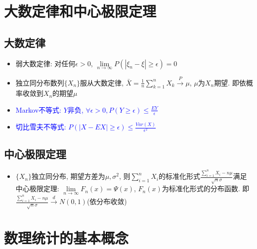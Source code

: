 \documentclass[UTF8]{article}
\begin{document}
\section{大数定律和中心极限定理}
\subsection{大数定律}
\begin{itemize}
\item 弱大数定律: 对任何$\epsilon>0$, $\lim\limits_{n\rightarrow\infty}P(|\xi_n-\xi|\ge\epsilon)=0$
\item 独立同分布数列$\{X_n\}$服从大数定律, $\bar{X}=\frac{1}{n}\sum\limits_{k=1}^nX_k\stackrel{P}{\longrightarrow}\mu$, $\mu$为$X_n$期望. 即依概率收敛到$X_n$的期望$\mu$
\item \textcolor{blue}{Markov不等式: $Y$非负, $\forall\epsilon>0, P(Y\ge\epsilon)\le\frac{EY}{\epsilon}$}
\item \textcolor{blue}{切比雪夫不等式: $P(|X-EX|\ge\epsilon)\le\frac{Var(X)}{\epsilon^2}$}
\end{itemize}
\subsection{中心极限定理}
\begin{itemize}
\item $\{X_n\}$独立同分布, 期望方差为$\mu,\sigma^2$, 则$\sum\limits_{i=1}^{n}X_i$的标准化形式$\frac{\sum\limits_{i=1}^{n}X_i-n\mu}{\sqrt{n}\sigma}$满足中心极限定理: $\lim\limits_{n\rightarrow\infty}F_n(x)=\Psi(x)$, $F_n(x)$为标准化形式的分布函数. 即$\frac{\sum\limits_{i=1}^{n}X_i-n\mu}{\sqrt{n}\sigma}\stackrel{d}{\longrightarrow}N(0,1)$(依分布收敛)
\end{itemize}

\section{数理统计的基本概念}
\end{document}
